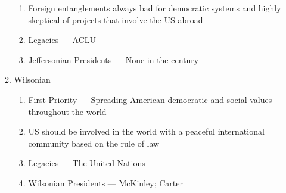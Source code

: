 \documentclass[12pt]{article}
\begin{document}
\begin{enumerate}
\begin{enumerate}
\begin{enumerate}
              \item Foreign entanglements always bad for democratic systems and highly skeptical of projects that involve the US abroad

              \item Legacies — ACLU

              \item Jeffersonian Presidents — None in the  century

            \end{enumerate}

          \item Wilsonian

            \begin{enumerate}

              \item First Priority — Spreading American democratic and social values throughout the world

              \item US should be involved in the world with a peaceful international community based on the rule of law

              \item Legacies — The United Nations

              \item Wilsonian Presidents — McKinley; Carter

            \end{enumerate}
                        
        \end{enumerate}

    \end{enumerate}
\end{document}
